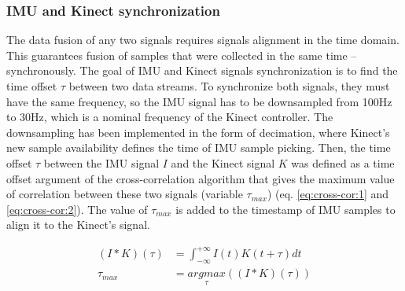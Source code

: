 \documentclass[sensors,article,submit,moreauthors,pdftex,10pt,a4paper]{mdpi}
\begin{document}
\subsubsection{IMU and Kinect synchronization}
The data fusion of any two signals requires signals alignment in the time domain. This guarantees fusion of samples that were collected in the same time -- synchronously. The goal of IMU and Kinect signals synchronization is to find the time offset $\tau$ between two data streams. To synchronize both signals, they must have the same frequency, so the IMU signal has to be downsampled from 100Hz to 30Hz, which is a nominal frequency of the Kinect controller. The downsampling has been implemented in the form of decimation, where Kinect’s new sample availability defines the time of IMU sample picking. Then, the time offset $\tau$ between the IMU signal $I$ and the Kinect signal $K$ was defined as a time offset argument of the cross-correlation algorithm that gives the maximum value of correlation between these two signals (variable $\tau_{max}$) (eq. \ref{eq:cross-cor:1} and \ref{eq:cross-cor:2}). The value of $\tau_{max}$ is added to the timestamp of IMU samples to align it to the Kinect’s signal.
		
\begin{subequations}
	\begin{align}
		(I \ast K)(\tau) & = \int_{-\infty}^{+\infty}I(t)K(t+\tau)dt\label{eq:cross-cor:1}   \\
		\tau_{max}       & = \underset{\tau}{argmax}((I \ast K)(\tau))\label{eq:cross-cor:2} 
	\end{align}
	\label{eq:cross-cor}
\end{subequations}
		
		
		
\end{document}
